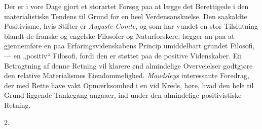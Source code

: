 \documentclass[12pt,a4paper,openany]{book}
\newcommand{\secnum}[1]{\par\begin{center}#1\end{center}\par\nobreak}
\newcommand{\opage}[1]{\marginnote{\footnotesize\textit{[#1]}}}
\begin{document}
Der er i vore Dage gjort et storartet Forsøg paa at
lægge det Berettigede i den materialistiske Tendens til Grund
for en heel Verdensanskuelse. Den saakaldte Positivisme,
hvis Stifter er \emph{Auguste Comte}, og som har vundet en
stor Tilslutning blandt de franske og engelske Filosofer og
Naturforskere, lægger an paa at gjennemføre en paa Erfaringsvidenskabens
Princip umiddelbart grundet Filosofi, ---
en „positiv“ Filosofi, fordi den er støttet paa de positive
Videnskaber. En Betragtning af denne Retning vil klarere
end almindelige Overveielser godtgjøre den relative Materialismes
Eiendommelighed. \emph{Maudsleys} interessante Foredrag,
der med Rette have vakt Opmærksomhed i en vid
Kreds, høre, hvad den hele til Grund liggende Tankegang
angaaer, ind under den almindelige positivistiske Retning.
\opage{200}\secnum{2.}
\end{document}
